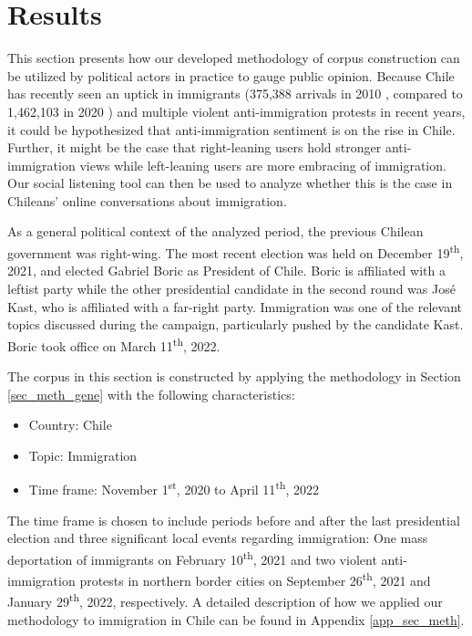 \section{Results}\label{sec_res}
    This section presents how our developed methodology of corpus construction can be utilized by political actors in practice to gauge public opinion. Because Chile has recently seen an uptick in immigrants (375,388 arrivals in 2010 \citep{datos_2010}, compared to 1,462,103 in 2020 \citep{ine_2020}) and multiple violent anti-immigration protests in recent years, it could be hypothesized that anti-immigration sentiment is on the rise in Chile. Further, it might be the case that right-leaning users hold stronger anti-immigration views while left-leaning users are more embracing of immigration. Our social listening tool can then be used to analyze whether this is the case in Chileans' online conversations about immigration.
    
    As a general political context of the analyzed period, the previous Chilean government was right-wing. %
    The most recent election was held on December 19\textsuperscript{th}, 2021, and elected Gabriel Boric as President of Chile. %
    Boric is affiliated with a leftist party while the other presidential candidate in the second round was José Kast, who is affiliated with a far-right party. Immigration was one of the relevant topics discussed during the campaign, particularly pushed by the candidate Kast. Boric took office on March 11\textsuperscript{th}, 2022.
    
    The corpus in this section is constructed by applying the methodology in Section \ref{sec_meth_gene} with the following characteristics:
        \begin{itemize}
            \item 
            Country: Chile
            
            \item 
            Topic: Immigration
            
            \item
            Time frame: November 1\textsuperscript{st}, 2020 to April 11\textsuperscript{th}, 2022
        \end{itemize}
                
        The time frame is chosen to include periods before and after the last presidential election and three significant local events regarding immigration: One mass deportation of immigrants on February 10\textsuperscript{th}, 2021 and two violent anti-immigration protests in northern border cities on September 26\textsuperscript{th}, 2021 and January 29\textsuperscript{th}, 2022, respectively. A detailed description of how we applied our methodology to immigration in Chile can be found in Appendix \ref{app_sec_meth}.